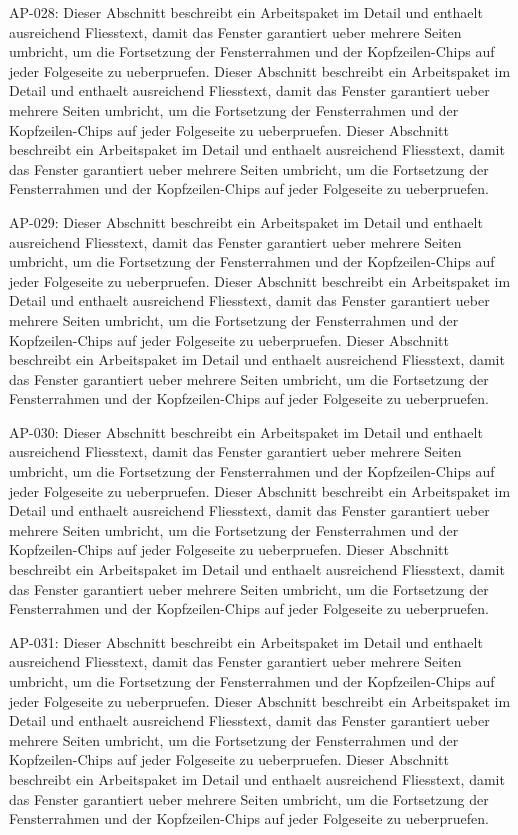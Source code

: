 \documentclass[type=report,theme=dark,language=de]{semio}
\begin{document}
\begin{Table}[title=Lange Tabelle]
AP-028: Dieser Abschnitt beschreibt ein Arbeitspaket im Detail und enthaelt ausreichend Fliesstext, damit das Fenster garantiert ueber mehrere Seiten umbricht, um die Fortsetzung der Fensterrahmen und der Kopfzeilen-Chips auf jeder Folgeseite zu ueberpruefen. Dieser Abschnitt beschreibt ein Arbeitspaket im Detail und enthaelt ausreichend Fliesstext, damit das Fenster garantiert ueber mehrere Seiten umbricht, um die Fortsetzung der Fensterrahmen und der Kopfzeilen-Chips auf jeder Folgeseite zu ueberpruefen. Dieser Abschnitt beschreibt ein Arbeitspaket im Detail und enthaelt ausreichend Fliesstext, damit das Fenster garantiert ueber mehrere Seiten umbricht, um die Fortsetzung der Fensterrahmen und der Kopfzeilen-Chips auf jeder Folgeseite zu ueberpruefen. 

AP-029: Dieser Abschnitt beschreibt ein Arbeitspaket im Detail und enthaelt ausreichend Fliesstext, damit das Fenster garantiert ueber mehrere Seiten umbricht, um die Fortsetzung der Fensterrahmen und der Kopfzeilen-Chips auf jeder Folgeseite zu ueberpruefen. Dieser Abschnitt beschreibt ein Arbeitspaket im Detail und enthaelt ausreichend Fliesstext, damit das Fenster garantiert ueber mehrere Seiten umbricht, um die Fortsetzung der Fensterrahmen und der Kopfzeilen-Chips auf jeder Folgeseite zu ueberpruefen. Dieser Abschnitt beschreibt ein Arbeitspaket im Detail und enthaelt ausreichend Fliesstext, damit das Fenster garantiert ueber mehrere Seiten umbricht, um die Fortsetzung der Fensterrahmen und der Kopfzeilen-Chips auf jeder Folgeseite zu ueberpruefen. 

AP-030: Dieser Abschnitt beschreibt ein Arbeitspaket im Detail und enthaelt ausreichend Fliesstext, damit das Fenster garantiert ueber mehrere Seiten umbricht, um die Fortsetzung der Fensterrahmen und der Kopfzeilen-Chips auf jeder Folgeseite zu ueberpruefen. Dieser Abschnitt beschreibt ein Arbeitspaket im Detail und enthaelt ausreichend Fliesstext, damit das Fenster garantiert ueber mehrere Seiten umbricht, um die Fortsetzung der Fensterrahmen und der Kopfzeilen-Chips auf jeder Folgeseite zu ueberpruefen. Dieser Abschnitt beschreibt ein Arbeitspaket im Detail und enthaelt ausreichend Fliesstext, damit das Fenster garantiert ueber mehrere Seiten umbricht, um die Fortsetzung der Fensterrahmen und der Kopfzeilen-Chips auf jeder Folgeseite zu ueberpruefen. 

AP-031: Dieser Abschnitt beschreibt ein Arbeitspaket im Detail und enthaelt ausreichend Fliesstext, damit das Fenster garantiert ueber mehrere Seiten umbricht, um die Fortsetzung der Fensterrahmen und der Kopfzeilen-Chips auf jeder Folgeseite zu ueberpruefen. Dieser Abschnitt beschreibt ein Arbeitspaket im Detail und enthaelt ausreichend Fliesstext, damit das Fenster garantiert ueber mehrere Seiten umbricht, um die Fortsetzung der Fensterrahmen und der Kopfzeilen-Chips auf jeder Folgeseite zu ueberpruefen. Dieser Abschnitt beschreibt ein Arbeitspaket im Detail und enthaelt ausreichend Fliesstext, damit das Fenster garantiert ueber mehrere Seiten umbricht, um die Fortsetzung der Fensterrahmen und der Kopfzeilen-Chips auf jeder Folgeseite zu ueberpruefen. 


\end{Table}
\end{document}
